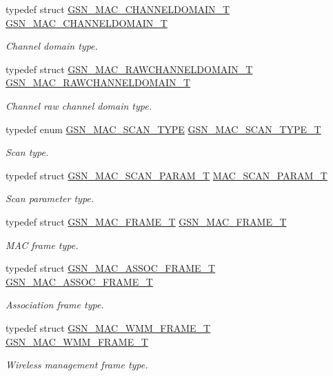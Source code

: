 \begin{DoxyCompactItemize}
typedef struct \hyperlink{a00113}{GSN\_\-MAC\_\-CHANNELDOMAIN\_\-T} \hyperlink{a00642_ga8ff4cc41b9827ad704cb982edb371b48}{GSN\_\-MAC\_\-CHANNELDOMAIN\_\-T}
\begin{DoxyCompactList}\small\item\em Channel domain type. \end{DoxyCompactList}\item 
typedef struct \hyperlink{a00127}{GSN\_\-MAC\_\-RAWCHANNELDOMAIN\_\-T} \hyperlink{a00642_gab8bb3634782377a5a3fd1c09ad5bedca}{GSN\_\-MAC\_\-RAWCHANNELDOMAIN\_\-T}
\begin{DoxyCompactList}\small\item\em Channel raw channel domain type. \end{DoxyCompactList}\item 
typedef enum \hyperlink{a00642_gacd7033290927ecd0c0b3b6e9829ecb2e}{GSN\_\-MAC\_\-SCAN\_\-TYPE} \hyperlink{a00642_ga25b1673dd1960a988e38a58156a53fd2}{GSN\_\-MAC\_\-SCAN\_\-TYPE\_\-T}
\begin{DoxyCompactList}\small\item\em Scan type. \end{DoxyCompactList}\item 
typedef struct \hyperlink{a00130}{GSN\_\-MAC\_\-SCAN\_\-PARAM\_\-T} \hyperlink{a00642_ga224c46962ac3e8d21a5dfc0d1a565391}{MAC\_\-SCAN\_\-PARAM\_\-T}
\begin{DoxyCompactList}\small\item\em Scan parameter type. \end{DoxyCompactList}\item 
typedef struct \hyperlink{a00116}{GSN\_\-MAC\_\-FRAME\_\-T} \hyperlink{a00642_gabe8a532741138f69c4e27fc2bb44af8c}{GSN\_\-MAC\_\-FRAME\_\-T}
\begin{DoxyCompactList}\small\item\em MAC frame type. \end{DoxyCompactList}\item 
typedef struct \hyperlink{a00109}{GSN\_\-MAC\_\-ASSOC\_\-FRAME\_\-T} \hyperlink{a00642_gab32a90b2661aaffd2fb7960c34e4bf76}{GSN\_\-MAC\_\-ASSOC\_\-FRAME\_\-T}
\begin{DoxyCompactList}\small\item\em Association frame type. \end{DoxyCompactList}\item 
typedef struct \hyperlink{a00136}{GSN\_\-MAC\_\-WMM\_\-FRAME\_\-T} \hyperlink{a00642_gab14ec7de1faea7e197f97d61281085fc}{GSN\_\-MAC\_\-WMM\_\-FRAME\_\-T}
\begin{DoxyCompactList}\small\item\em Wireless management frame type. \end{DoxyCompactList}\item 

\end{DoxyCompactItemize}
